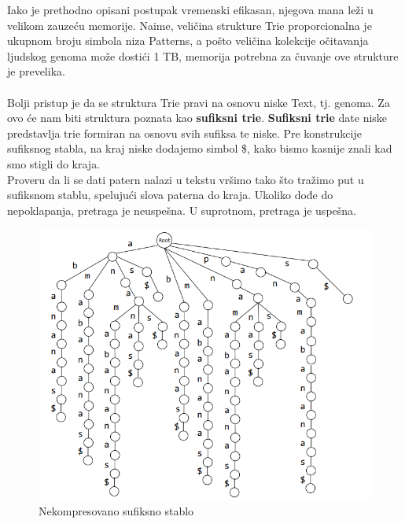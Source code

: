 Iako je prethodno opisani postupak vremenski efikasan, njegova mana leži u velikom zauzeću memorije. Naime, veličina strukture Trie proporcionalna je  ukupnom broju simbola niza Patterns, a pošto veličina kolekcije očitavanja ljudskog genoma može dostići 1 TB, memorija potrebna za čuvanje ove strukture je prevelika.\\\\
Bolji pristup je da se struktura Trie pravi na osnovu niske Text, tj. genoma. Za ovo će nam biti struktura poznata kao \textbf{sufiksni trie}. \textbf{Sufiksni trie} date niske predstavlja trie formiran na osnovu svih sufiksa te niske. Pre konstrukcije sufiksnog stabla, na kraj niske dodajemo simbol \$, kako bismo kasnije znali kad smo stigli do kraja.\\
Proveru da li se dati patern nalazi u tekstu vršimo tako što tražimo put u sufiksnom stablu, spelujući slova paterna do kraja. Ukoliko dođe do nepoklapanja, pretraga je neuspešna. U suprotnom, pretraga je uspešna.
\begin{figure}[h!]
\centering
\includegraphics[scale=0.5]{poglavlja/9/slike/sufiksnoStabloNekompresovano.png}
\caption{Nekompresovano sufiksno stablo}
\label{slika:X}
\end{figure}


